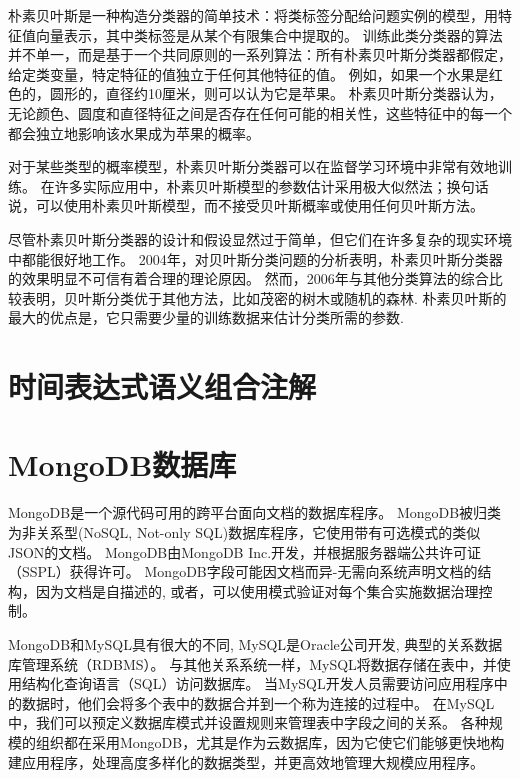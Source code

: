 朴素贝叶斯是一种构造分类器的简单技术：将类标签分配给问题实例的模型，用特征值向量表示，其中类标签是从某个有限集合中提取的。
训练此类分类器的算法并不单一，而是基于一个共同原则的一系列算法：所有朴素贝叶斯分类器都假定，给定类变量，特定特征的值独立于任何其他特征的值。
例如，如果一个水果是红色的，圆形的，直径约10厘米，则可以认为它是苹果。
朴素贝叶斯分类器认为，无论颜色、圆度和直径特征之间是否存在任何可能的相关性，这些特征中的每一个都会独立地影响该水果成为苹果的概率。

对于某些类型的概率模型，朴素贝叶斯分类器可以在监督学习环境中非常有效地训练。
在许多实际应用中，朴素贝叶斯模型的参数估计采用极大似然法；换句话说，可以使用朴素贝叶斯模型，而不接受贝叶斯概率或使用任何贝叶斯方法\cite{hand2007idiot}。

尽管朴素贝叶斯分类器的设计和假设显然过于简单，但它们在许多复杂的现实环境中都能很好地工作。
2004年，对贝叶斯分类问题的分析表明，朴素贝叶斯分类器的效果明显不可信有着合理的理论原因。
然而，2006年与其他分类算法的综合比较表明，贝叶斯分类优于其他方法，比如茂密的树木或随机的森林.
朴素贝叶斯的最大的优点是，它只需要少量的训练数据来估计分类所需的参数\cite{10.1145/1143844.1143865}.

\section{时间表达式语义组合注解}



\section{MongoDB数据库}

MongoDB是一个源代码可用的跨平台面向文档的数据库程序。
MongoDB被归类为非关系型(NoSQL, Not-only SQL)数据库程序，它使用带有可选模式的类似JSON的文档。
MongoDB由MongoDB Inc.开发，并根据服务器端公共许可证（SSPL）获得许可。
MongoDB字段可能因文档而异-无需向系统声明文档的结构，因为文档是自描述的, 或者，可以使用模式验证对每个集合实施数据治理控制。

MongoDB和MySQL具有很大的不同\cite{Győrödi2015comparative}, MySQL是Oracle公司开发, 典型的关系数据库管理系统（RDBMS）。
与其他关系系统一样，MySQL将数据存储在表中，并使用结构化查询语言（SQL）访问数据库。
当MySQL开发人员需要访问应用程序中的数据时，他们会将多个表中的数据合并到一个称为连接的过程中。
在MySQL中，我们可以预定义数据库模式并设置规则来管理表中字段之间的关系。
各种规模的组织都在采用MongoDB，尤其是作为云数据库，因为它使它们能够更快地构建应用程序，处理高度多样化的数据类型，并更高效地管理大规模应用程序。

